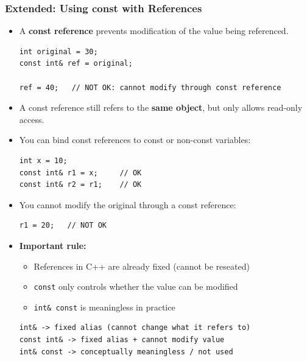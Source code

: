 \documentclass[10pt]{article}
\begin{document}
\newpage

\subsubsection{Extended: Using const with References}

\begin{itemize}
    \item A \textbf{const reference} prevents modification of the value being referenced.

    \begin{verbatim}
int original = 30;
const int& ref = original;

ref = 40;   // NOT OK: cannot modify through const reference
    \end{verbatim}

    \item A const reference still refers to the \textbf{same object}, but only allows read-only access.

    \item You can bind const references to const or non-const variables:

    \begin{verbatim}
int x = 10;
const int& r1 = x;     // OK
const int& r2 = r1;    // OK
    \end{verbatim}

    \item You cannot modify the original through a const reference:

    \begin{verbatim}
r1 = 20;   // NOT OK
    \end{verbatim}

    \item \textbf{Important rule:}
    \begin{itemize}
        \item References in C++ are already fixed (cannot be reseated)
        \item \verb|const| only controls whether the value can be modified
        \item \verb|int& const| is meaningless in practice
    \end{itemize}

	\begin{verbatim}
int& -> fixed alias (cannot change what it refers to)
const int& -> fixed alias + cannot modify value
int& const -> conceptually meaningless / not used
	\end{verbatim}
\end{itemize}
\end{document}
